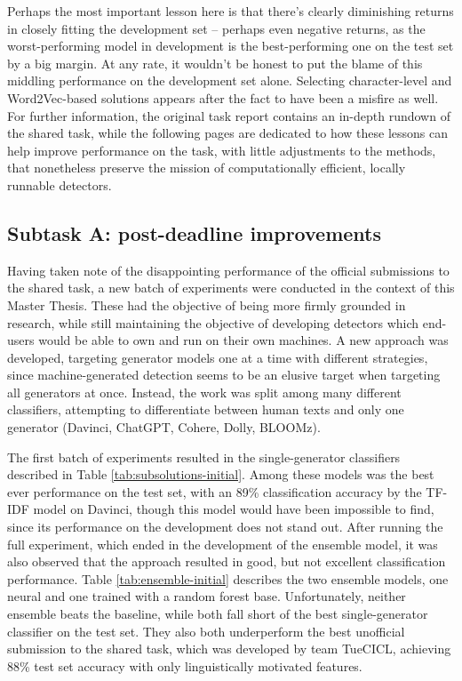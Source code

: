 Perhaps the most important lesson here is that there's clearly diminishing returns in closely fitting the development set -- perhaps even negative returns, as the worst-performing model in development is the best-performing one on the test set by a big margin.
At any rate, it wouldn't be honest to put the blame of this middling performance on the development set alone.
Selecting character-level and Word2Vec-based solutions appears after the fact to have been a misfire as well.
For further information, the original task report \citep{stuhlinger-winkler-2024-tuecicl} contains an in-depth rundown of the shared task, while the following pages are dedicated to how these lessons can help improve performance on the task, with little adjustments to the methods, that nonetheless preserve the mission of computationally efficient, locally runnable detectors.

\subsection{Subtask A: post-deadline improvements}

Having taken note of the disappointing performance of the official submissions to the shared task, a new batch of experiments were conducted in the context of this Master Thesis.
These had the objective of being more firmly grounded in research, while still maintaining the objective of developing detectors which end-users would be able to own and run on their own machines.
A new approach was developed, targeting generator models one at a time with different strategies, since machine-generated detection seems to be an elusive target when targeting all generators at once.
Instead, the work was split among many different classifiers, attempting to differentiate between human texts and only one generator (Davinci, ChatGPT, Cohere, Dolly, BLOOMz).

The first batch of experiments resulted in the single-generator classifiers described in Table \ref{tab:subsolutions-initial}.
Among these models was the best ever performance on the test set, with an 89\% classification accuracy by the TF-IDF model on Davinci, though this model would have been impossible to find, since its performance on the development does not stand out.
After running the full experiment, which ended in the development of the ensemble model, it was also observed that the approach resulted in good, but not excellent classification performance.
Table \ref{tab:ensemble-initial} describes the two ensemble models, one neural and one trained with a random forest base.
Unfortunately, neither ensemble beats the baseline, while both fall short of the best single-generator classifier on the test set.
They also both underperform the best unofficial submission to the shared task, which was developed by team TueCICL, achieving 88\% test set accuracy with only linguistically motivated features.


